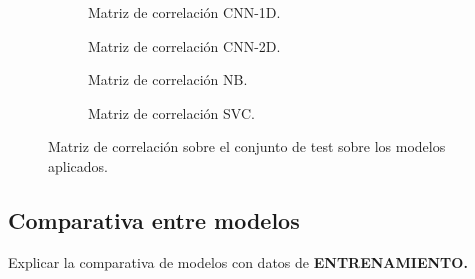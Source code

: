     \begin{figure}
        \centering
        \begin{subfigure}[b]{0.4\textwidth}
            \centering
            
            \caption{Matriz de correlación CNN-1D.}
            \label{ConfussionMatrixImages:1D}
        \end{subfigure}
        \begin{subfigure}[b]{0.4\textwidth}
            \centering
            
            \caption{Matriz de correlación CNN-2D.} 
            \label{ConfussionMatrixImages:2D}

        \end{subfigure}
        \begin{subfigure}[b]{0.4\textwidth}
            \centering
            
            \caption{Matriz de correlación NB.}
            \label{ConfussionMatrixImages:NB}
        \end{subfigure}
        \begin{subfigure}[b]{0.4\textwidth}
            \centering
            
            \caption{Matriz de correlación SVC.}
            \label{ConfussionMatrixImages:SVC}
        \end{subfigure}
        \caption{Matriz de correlación sobre el conjunto de test sobre los modelos aplicados.}
        \label{ConfussionMatrixImages}
     \end{figure}

  \subsection{Comparativa entre modelos}

    Explicar la comparativa de modelos con datos de \textbf{ENTRENAMIENTO.}


